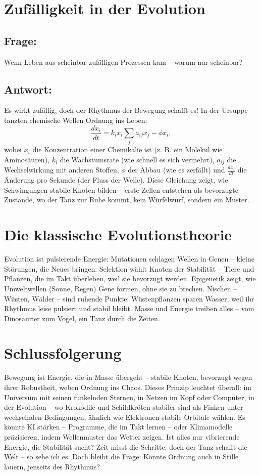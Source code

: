 \documentclass{article}
\begin{document}
	\section{Zufälligkeit in der Evolution}
	
	\subsection*{Frage:}
	Wenn Leben aus scheinbar zufälligen Prozessen kam – warum nur scheinbar?
	
	\subsection*{Antwort:}
	Es wirkt zufällig, doch der Rhythmus der Bewegung schafft es! In der Ursuppe tanzten chemische Wellen Ordnung ins Leben:
	\begin{equation}
		\frac{dx_i}{dt} = k_i x_i \sum_j a_{ij} x_j - \phi x_i,
	\end{equation}
	wobei $x_i$ die Konzentration einer Chemikalie ist (z. B. ein Molekül wie Aminosäuren), $k_i$ die Wachstumsrate (wie schnell es sich vermehrt), $a_{ij}$ die Wechselwirkung mit anderen Stoffen, $\phi$ der Abbau (wie es zerfällt) und $\frac{dx_i}{dt}$ die Änderung pro Sekunde (der Fluss der Welle). Diese Gleichung zeigt, wie Schwingungen stabile Knoten bilden – erste Zellen entstehen als bevorzugte Zustände, wo der Tanz zur Ruhe kommt, kein Würfelwurf, sondern ein Muster.
	
	\section{Die klassische Evolutionstheorie}
	Evolution ist pulsierende Energie: Mutationen schlagen Wellen in Genen – kleine Störungen, die Neues bringen. Selektion wählt Knoten der Stabilität – Tiere und Pflanzen, die im Takt überleben, weil sie bevorzugt werden. Epigenetik zeigt, wie Umweltwellen (Sonne, Regen) Gene formen, ohne sie zu brechen. Nischen – Wüsten, Wälder – sind ruhende Punkte: Wüstenpflanzen sparen Wasser, weil ihr Rhythmus leise pulsiert und stabil bleibt. Masse und Energie treiben alles – vom Dinosaurier zum Vogel, ein Tanz durch die Zeiten.
	
	\section{Schlussfolgerung}
	Bewegung ist Energie, die in Masse übergeht – stabile Knoten, bevorzugt wegen ihrer Robustheit, weben Ordnung ins Chaos. Dieses Prinzip leuchtet überall: im Universum mit seinen funkelnden Sternen, in Netzen im Kopf oder Computer, in der Evolution – wo Krokodile und Schildkröten stabiler sind als Finken unter wechselnden Bedingungen, ähnlich wie Elektronen stabile Orbitale wählen. Es könnte KI stärken – Programme, die im Takt lernen – oder Klimamodelle präzisieren, indem Wellenmuster das Wetter zeigen. Ist alles nur vibrierende Energie, die Stabilität sucht? Zeit misst die Schritte, doch der Tanz schafft die Welt – so sehe ich es. Doch bleibt die Frage: Könnte Ordnung auch in Stille lauern, jenseits des Rhythmus?
\end{document}
